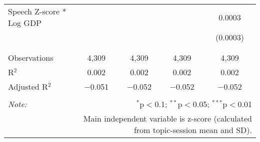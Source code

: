 \begin{table}[!htbp]
\begin{tabular}{@{\extracolsep{5pt}}lcccc}
 Speech Z-score * Log GDP &  &  &  & 0.0003 \\ 
  &  &  &  & (0.0003) \\ 
  & & & & \\ 
\hline \\[-1.8ex] 
Observations & 4,309 & 4,309 & 4,309 & 4,309 \\ 
R$^{2}$ & 0.002 & 0.002 & 0.002 & 0.002 \\ 
Adjusted R$^{2}$ & $-$0.051 & $-$0.052 & $-$0.052 & $-$0.052 \\ 
\hline 
\hline \\[-1.8ex] 
\textit{Note:}  & \multicolumn{4}{r}{$^{*}$p$<$0.1; $^{**}$p$<$0.05; $^{***}$p$<$0.01} \\ 
 & \multicolumn{4}{r}{Main independent variable is z-score (calculated from topic-session mean and SD).} \\ 
\end{tabular} 
\end{table} 
